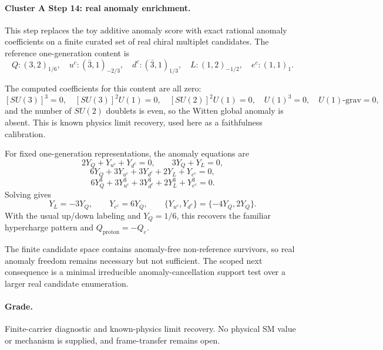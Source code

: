 \paragraph{Cluster A Step 14: real anomaly enrichment.}

This step replaces the toy additive anomaly score with exact rational anomaly
coefficients on a finite curated set of real chiral multiplet candidates.  The
reference one-generation content is
\[
Q:(3,2)_{1/6},\quad u^c:(\bar 3,1)_{-2/3},\quad
d^c:(\bar 3,1)_{1/3},\quad L:(1,2)_{-1/2},\quad e^c:(1,1)_1 .
\]

The computed coefficients for this content are all zero:
\[
[SU(3)]^3=0,\quad [SU(3)]^2U(1)=0,\quad [SU(2)]^2U(1)=0,\quad
U(1)^3=0,\quad U(1)\text{-grav}=0 ,
\]
and the number of \(SU(2)\) doublets is even, so the Witten global anomaly is
absent. This is known physics limit recovery, used here as a faithfulness
calibration.

For fixed one-generation representations, the anomaly equations are
\[
2Y_Q+Y_{u^c}+Y_{d^c}=0,\qquad 3Y_Q+Y_L=0,
\]
\[
6Y_Q+3Y_{u^c}+3Y_{d^c}+2Y_L+Y_{e^c}=0,
\]
\[
6Y_Q^3+3Y_{u^c}^3+3Y_{d^c}^3+2Y_L^3+Y_{e^c}^3=0 .
\]
Solving gives
\[
Y_L=-3Y_Q,\qquad Y_{e^c}=6Y_Q,\qquad
\{Y_{u^c},Y_{d^c}\}=\{-4Y_Q,2Y_Q\}.
\]
With the usual up/down labeling and \(Y_Q=1/6\), this recovers the familiar
hypercharge pattern and \(Q_{\mathrm{proton}}=-Q_e\).

The finite candidate space contains anomaly-free non-reference survivors, so
real anomaly freedom remains necessary but not sufficient.  The scoped next
consequence is a minimal irreducible anomaly-cancellation support test over a
larger real candidate enumeration.

\paragraph{Grade.}
Finite-carrier diagnostic and known-physics limit recovery.  No physical SM
value or mechanism is supplied, and frame-transfer remains open.
